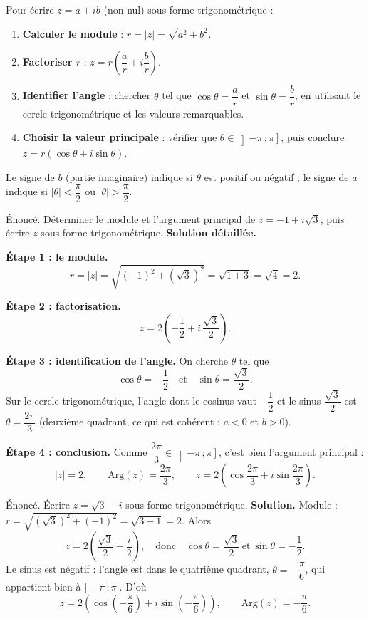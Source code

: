 \documentclass[11pt]{article}
\begin{document}
\begin{methode}
Pour écrire $z = a+ib$ (non nul) sous forme trigonométrique :
\begin{enumerate}
\item \textbf{Calculer le module} : $r = |z| = \sqrt{a^2+b^2}$.
\item \textbf{Factoriser $r$} : $z = r\left(\dfrac{a}{r} + i\dfrac{b}{r}\right)$.
\item \textbf{Identifier l'angle} : chercher $\theta$ tel que $\cos\theta = \dfrac{a}{r}$ et $\sin\theta = \dfrac{b}{r}$, en utilisant le cercle trigonométrique et les valeurs remarquables.
\item \textbf{Choisir la valeur principale} : vérifier que $\theta \in \left]-\pi\,;\pi\right]$, puis conclure $z = r(\cos\theta + i\sin\theta)$.
\end{enumerate}
Le signe de $b$ (partie imaginaire) indique si $\theta$ est positif ou négatif ; le signe de $a$ indique si $|\theta| < \dfrac{\pi}{2}$ ou $|\theta| > \dfrac{\pi}{2}$.
\end{methode}

\begin{exoresolu}[Mise sous forme trigonométrique de $z = -1 + i\sqrt{3}$]
Énoncé. Déterminer le module et l'argument principal de $z = -1 + i\sqrt{3}$, puis écrire $z$ sous forme trigonométrique.
\tcblower
\textbf{Solution détaillée.}

\textbf{Étape 1 : le module.}
\[ r = |z| = \sqrt{(-1)^2 + (\sqrt{3})^2} = \sqrt{1+3} = \sqrt{4} = 2. \]

\textbf{Étape 2 : factorisation.}
\[ z = 2\left(-\frac{1}{2} + i\,\frac{\sqrt{3}}{2}\right). \]

\textbf{Étape 3 : identification de l'angle.} On cherche $\theta$ tel que
\[ \cos\theta = -\frac{1}{2} \quad \text{et} \quad \sin\theta = \frac{\sqrt{3}}{2}. \]
Sur le cercle trigonométrique, l'angle dont le cosinus vaut $-\dfrac{1}{2}$ et le sinus $\dfrac{\sqrt{3}}{2}$ est $\theta = \dfrac{2\pi}{3}$ (deuxième quadrant, ce qui est cohérent : $a<0$ et $b>0$).

\textbf{Étape 4 : conclusion.} Comme $\dfrac{2\pi}{3} \in \left]-\pi\,;\pi\right]$, c'est bien l'argument principal :
\[ |z| = 2, \qquad \mathrm{Arg}(z) = \frac{2\pi}{3}, \qquad z = 2\left(\cos\frac{2\pi}{3} + i\sin\frac{2\pi}{3}\right). \]
\end{exoresolu}

\begin{exoresolu}[Un argument négatif : $z = \sqrt{3} - i$]
Énoncé. Écrire $z = \sqrt{3} - i$ sous forme trigonométrique.
\tcblower
\textbf{Solution.} Module : $r = \sqrt{(\sqrt{3})^2+(-1)^2} = \sqrt{3+1} = 2$. Alors
\[ z = 2\left(\frac{\sqrt{3}}{2} - \frac{i}{2}\right), \quad \text{donc} \quad \cos\theta = \frac{\sqrt{3}}{2} \ \text{et}\ \sin\theta = -\frac{1}{2}. \]
Le sinus est négatif : l'angle est dans le quatrième quadrant, $\theta = -\dfrac{\pi}{6}$, qui appartient bien à $]-\pi\,;\pi]$. D'où
\[ z = 2\left(\cos\left(-\frac{\pi}{6}\right) + i\sin\left(-\frac{\pi}{6}\right)\right), \qquad \mathrm{Arg}(z) = -\frac{\pi}{6}. \]
\end{exoresolu}
\end{document}
